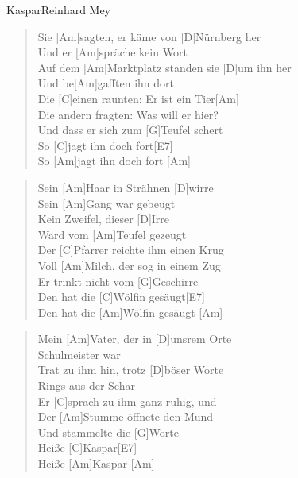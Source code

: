 \begin{song}{Kaspar}{Reinhard Mey}

    \begin{verse}  
        Sie [Am]sagten, er käme von [D]N\"urnberg her \\
        Und er [Am]spräche kein Wort \\
        Auf dem [Am]Marktplatz standen sie [D]um ihn her \\
        Und be[Am]gafften ihn dort \\
        Die [C]einen raunten: Er ist ein Tier[Am] \\
        Die andern fragten: Was will er hier? \\
        [D]Und dass er sich zum [G]Teufel schert \\
        So [C]jagt ihn doch fort[E7] \\
        So [Am]jagt ihn doch fort \hspace{1em}[Am]
    \end{verse}  

    \begin{verse}  
        Sein [Am]Haar in Strähnen [D]wirre \\
        Sein [Am]Gang war gebeugt \\
        [Am]Kein Zweifel, dieser [D]Irre \\
        Ward vom [Am]Teufel gezeugt \\
        Der [C]Pfarrer reichte ihm einen Krug \\
        Voll [Am]Milch, der sog in einem Zug \\
        [D]Er trinkt nicht vom [G]Geschirre \\
        Den hat die [C]Wölfin gesäugt[E7] \\
        Den hat die [Am]Wölfin gesäugt \hspace{1em}[Am]
    \end{verse}  

    \begin{verse}  
        Mein [Am]Vater, der in [D]unsrem Orte \\
        [Am]Schulmeister war \\
        [Am]Trat zu ihm hin, trotz [D]böser Worte \\
        [Am]Rings aus der Schar \\
        Er [C]sprach zu ihm ganz ruhig, und \\
        Der [Am]Stumme öffnete den Mund \\
        [D]Und stammelte die [G]Worte \\
        Heiße [C]Kaspar[E7] \\
        Heiße [Am]Kaspar \hspace{1em}[Am]
    \end{verse}  


\end{song}
